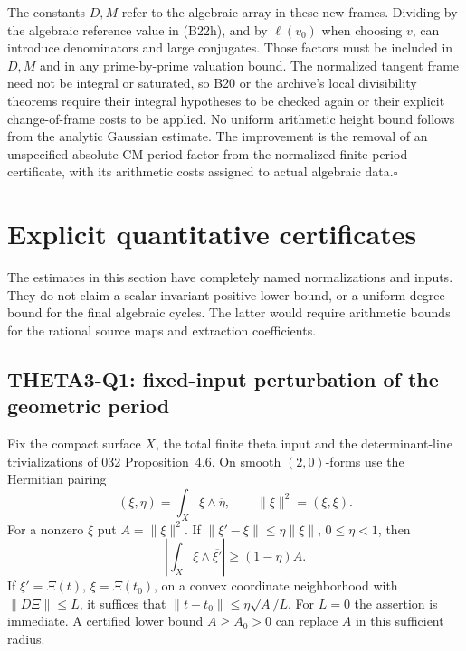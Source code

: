 \documentclass[11pt]{article}
\theoremstyle{definition}\newtheorem{definition}[theorem]{Definition}\newtheorem{remark}[theorem]{Remark}
\begin{document}
The constants $D,M$ refer to the algebraic array in these
new frames.  Dividing by the algebraic reference value in
(B22h), and by $\ell(v_0)$ when choosing $v$, can introduce
denominators and large conjugates.  Those factors must be
included in $D,M$ and in any prime-by-prime valuation bound.
The normalized tangent frame need not be integral or
saturated, so B20 or the archive's local divisibility
theorems require their integral hypotheses to be checked
again or their explicit change-of-frame costs to be applied.
No uniform arithmetic height bound follows from the analytic
Gaussian estimate.  The improvement is the removal of an
unspecified absolute CM-period factor from the normalized
finite-period certificate, with its arithmetic costs assigned
to actual algebraic data.\hfill$\square$


\section{Explicit quantitative certificates}
\label{sec:quantitative}
The estimates in this section have completely named normalizations and inputs. They do not claim a scalar-invariant positive lower bound, or a uniform degree bound for the final algebraic cycles. The latter would require arithmetic bounds for the rational source maps and extraction coefficients.

\subsection{THETA3-Q1: fixed-input perturbation of the geometric period}\label{Q1}
Fix the compact surface $X$, the total finite theta input and the determinant-line trivializations of 032 Proposition~4.6. On smooth $(2,0)$-forms use the Hermitian pairing
\[
 (\xi,\eta)=\int_X\xi\wedge\overline\eta,
 \qquad \|\xi\|^2=(\xi,\xi).
\]
For a nonzero $\xi$ put $A=\|\xi\|^2$. If
$\|\xi'-\xi\|\leq\eta\|\xi\|$, $0\leq\eta<1$, then
\begin{equation}\label{eq:perturb}
 \left|\int_X\xi\wedge\overline{\xi'}\right|
 \geq (1-\eta)A.
\end{equation}
If $\xi'=\Xi(t)$, $\xi=\Xi(t_0)$, on a convex coordinate neighborhood with $\|D\Xi\|\leq L$, it suffices that
$\|t-t_0\|\leq\eta\sqrt A/L$. For $L=0$ the assertion is immediate. A certified lower bound $A\geq A_0>0$ can replace $A$ in this sufficient radius.
\end{document}
